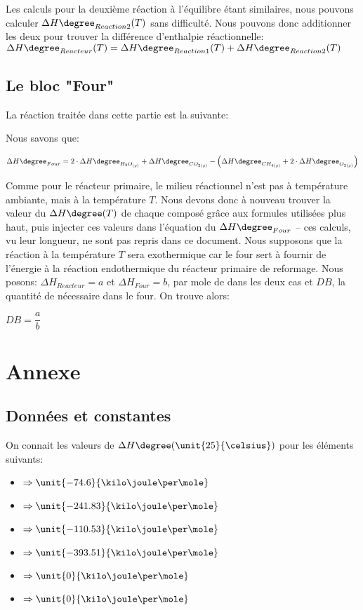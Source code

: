 \documentclass[11pt,a4paper]{report}
\begin{document}
Les calculs pour la deuxième réaction à l'équilibre étant similaires, nous pouvons
calculer $\Delta H\degree_{Reaction2}(T)$ sans difficulté. Nous pouvons donc additionner les deux pour trouver
la différence d'enthalpie réactionnelle: $\Delta H\degree_{Reacteur}(T)=\Delta H\degree_{Reaction1}(T)+\Delta H\degree_{Reaction2}(T)$

\subsection*{Le bloc "Four"}
La réaction traitée dans cette partie est la suivante:


Nous savons que:

$\Delta H\degree_{Four} = 2\cdot \Delta H\degree_{H_{2}O_{(g)}} + \Delta H\degree_{CO_{2(g)}}
- \left(\Delta H\degree_{CH_{4(g)}} + 2\cdot \Delta H\degree_{O_{2(g)}}\right)$

Comme pour le réacteur primaire, le milieu réactionnel n'est pas à température ambiante, mais à la température $T$. 
Nous devons donc à nouveau trouver la valeur du $\Delta H\degree(T)$ de chaque composé grâce aux formules utilisées plus haut,
puis injecter ces valeurs dans l'équation du $\Delta H\degree_{Four}$ -- ces calculs, vu leur longueur, ne sont pas repris dans
ce document.
Nous supposons que la réaction à la température $T$ sera exothermique car le four sert à fournir de l'énergie à la réaction
endothermique du réacteur primaire de reformage.
Nous posons: $\Delta H_{Reacteur} = a$ et $\Delta H_{Four} = b$, par mole de  dans les deux cas et $DB$, la quantité 
de  nécessaire dans le four.
On trouve alors:

$DB = \dfrac{a}{b}$



\section*{Annexe}
\subsection*{Données et constantes}
On connait les valeurs de $\Delta H\degree (\unit{25}{\celsius})$ pour les éléments suivants:

\begin{itemize}
\item{ $\Rightarrow \unit{-74.6}{\kilo\joule\per\mole}$}
\item{ $\Rightarrow \unit{-241.83}{\kilo\joule\per\mole}$}
\item{ $\Rightarrow \unit{-110.53}{\kilo\joule\per\mole}$}
\item{ $\Rightarrow \unit{-393.51}{\kilo\joule\per\mole}$}
\item{ $\Rightarrow \unit{0}{\kilo\joule\per\mole}$}
\item{ $\Rightarrow \unit{0}{\kilo\joule\per\mole}$}
\end{itemize}
\end{document}
